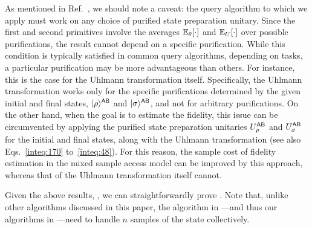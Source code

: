 As mentioned in Ref.~\cite{tang2025conjugatequerieshelp}, we should note a caveat: the query algorithm to which we apply  must work on any choice of purified state preparation unitary. Since the first and second primitives involve the averages $\mathbb{E}_\theta[\cdot]$ and $\mathbb{E}_U[\cdot]$ over possible purifications, the result cannot depend on a specific purification. 
While this condition is typically satisfied in common query algorithms, depending on tasks, a particular purification may be more advantageous than others. For instance, this is the case for the Uhlmann transformation itself. Specifically, the Uhlmann transformation works only for the specific purifications determined by the given initial and final states, $|\rho\rangle^{{\mathsf{A}}{\mathsf{B}}}$ and $|\sigma\rangle^{{\mathsf{A}}{\mathsf{B}}}$, and not for arbitrary purifications. On the other hand, when the goal is to estimate the fidelity, this issue can be circumvented by applying the purified state preparation unitaries $U_\rho^{{\mathsf{A}}{\mathsf{B}}}$ and $U_\sigma^{{\mathsf{A}}{\mathsf{B}}}$ for the initial and final states, along with the Uhlmann transformation (see also Eqs.~\eqref{inteq:170} to~\eqref{inteq:48}). For this reason, the sample cost of fidelity estimation in the mixed sample access model can be improved by this approach, whereas that of the Uhlmann transformation itself cannot.





Given the above results, , we can straightforwardly prove .
Note that, unlike other algorithms discussed in this paper, the algorithm in ---and thus our algorithms in ---need to handle $n$ samples of the state collectively.







